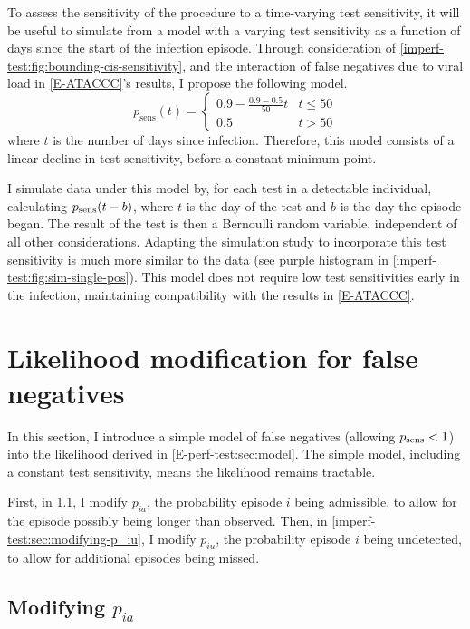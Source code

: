 \documentclass[thesis.tex]{subfiles}
\begin{document}
To assess the sensitivity of the procedure to a time-varying test sensitivity, it will be useful to simulate from a model with a varying test sensitivity as a function of days since the start of the infection episode.
Through consideration of \cref{imperf-test:fig:bounding-cis-sensitivity}, and the interaction of false negatives due to viral load in \cref{E-ATACCC}'s results, I propose the following model.
\begin{equation}
  p_\text{sens}(t) = \begin{cases}
    0.9 - \frac{0.9-0.5}{50}t &t \leq 50 \\
    0.5 &t > 50
  \end{cases}
  \label{imperf-test:eq:variable-test-sensitivity}
\end{equation}
where $t$ is the number of days since infection.
Therefore, this model consists of a linear decline in test sensitivity, before a constant minimum point.

I simulate data under this model by, for each test in a detectable individual, calculating $p_\text{sens}(t-b)$, where $t$ is the day of the test and $b$ is the day the episode began.
The result of the test is then a Bernoulli random variable, independent of all other considerations.
Adapting the simulation study to incorporate this test sensitivity is much more similar to the data (see purple histogram in \cref{imperf-test:fig:sim-single-pos}).
This model does not require low test sensitivities early in the infection, maintaining compatibility with the results in \cref{E-ATACCC}.

\section{Likelihood modification for false negatives} \label{imperf-test:sec:modelling}

In this section, I introduce a simple model of false negatives (\ie allowing $p_\text{sens} < 1$) into the likelihood derived in \cref{E-perf-test:sec:model}.
The simple model, including a constant test sensitivity, means the likelihood remains tractable.

First, in \cref{imperf-test:sec:modifying-p_ia}, I modify $p_{ia}$, the probability episode $i$ being admissible, to allow for the episode possibly being longer than observed.
Then, in \cref{imperf-test:sec:modifying-p_iu}, I modify $p_{iu}$, the probability episode $i$ being undetected, to allow for additional episodes being missed.

\subsection{Modifying \texorpdfstring{$p_{ia}$}{pia}} \label{imperf-test:sec:modifying-p_ia}
\end{document}
